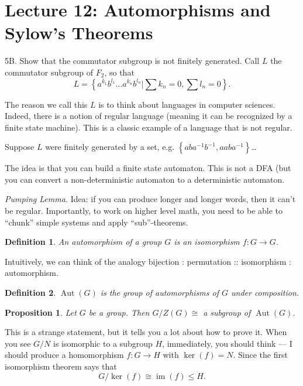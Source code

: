 \documentclass[12pt]{article}
\newtheorem*{definition}{Definition}
\newtheorem*{prop}{Proposition}
\DeclareMathOperator{\Aut}{Aut}
\DeclareMathOperator{\im}{im}
\begin{document}
\section{Lecture 12: Automorphisms and Sylow's Theorems}

5B.  Show that the commutator subgroup is not finitely generated.  Call $L$ the commutator subgroup of $F_2$, so that
\[
  L = \left\{ a^{k_1} b^{l_1} \dots a^{k_n} b^{l_n} | \sum k_n = 0, \sum l_n = 0 \right\}.
  \]

  The reason we call this $L$ is to think about languages in computer sciences.  Indeed, there is a notion of regular language (meaning it can be recognized by a finite state machine).  This is a classic example of a language that is not regular.

  Suppose $L$ were finitely generated by a set, e.g. $\left\{ aba^{-1} b^{-1}, aaba^{-1} \right\}$\dots

  The idea is that you can build a finite state automaton.  This is not a DFA (but you can convert a non-deterministic automaton to a deterministic automaton.

    {\it Pumping Lemma.} Idea: if you can produce longer and longer words, then it can't be regular.  Importantly, to work on higher level math, you need to be able to ``chunk'' simple systems and apply ``sub''-theorems.

    \begin{definition}
      An automorphism of a group $G$ is an isomorphism $f: G \to G$.
    \end{definition}

    Intuitively, we can think of the analogy bijection : permutation :: isomorphism : automorphism.

    \begin{definition}
      $\Aut(G)$ is the group of automorphisms of $G$ under composition. \\
    \end{definition}

  \begin{prop}
    Let $G$ be a group.  Then $G / Z(G) \cong$ a subgroup of $\Aut(G)$.
  \end{prop}

  This is a strange statement, but it tells you a lot about how to prove it.  When you see $G/N$ is isomorphic to a subgroup $H$, immediately, you should think --- I should produce a homomorphism $f: G \to H$ with $\ker (f) = N$.  Since the first isomorphism theorem says that
  \[
    G / \ker(f) \cong \im (f) \leq H.
    \]
\end{document}
